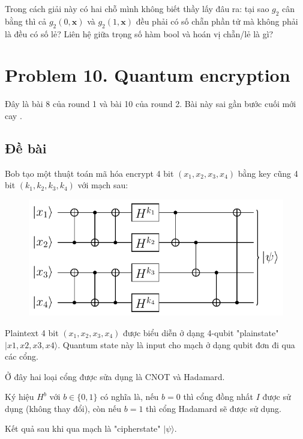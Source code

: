 Trong cách giải này có hai chỗ mình không biết thầy lấy đâu ra: tại sao $g_2$ cân bằng thì cả $g_2(0, \bm{x})$ và $g_2(1, \bm{x})$ đều phải có số chẵn phần tử mà không phải là đều có số lẻ? Liên hệ giữa trọng số hàm bool và hoán vị chẵn/lẻ là gì?

\section*{Problem 10. Quantum encryption}

Đây là bài 8 của round 1 và bài 10 của round 2. Bài này sai gần bước cuối mới cay .

\subsection*{Đề bài}

Bob tạo một thuật toán mã hóa encrypt 4 bit $(x_1, x_2, x_3, x_4)$ bằng key cũng 4 bit $(k_1, k_2, k_3, k_4)$ với mạch sau:

\begin{figure}[ht]
    \centering
    \includegraphics[page=1]{nsucrypto/2023/problem10_figures.pdf}
\end{figure}

Plaintext 4 bit $(x_1, x_2, x_3, x_4)$ được biểu diễn ở dạng 4-qubit "plainstate" $\lvert x1, x2, x3, x4 \rangle$. Quantum state này là input cho mạch ở dạng qubit đơn đi qua các cổng.

Ở đây hai loại cổng được sửa dụng là CNOT và Hadamard.

Ký hiệu $H^b$ với $b \in \{ 0, 1 \}$ có nghĩa là, nếu $b = 0$ thì cổng đồng nhất $I$ được sử dụng (không thay đổi), còn nếu $b = 1$ thì cổng Hadamard sẽ được sử dụng.

Kết quả sau khi qua mạch là "cipherstate" $\lvert \psi \rangle$.

